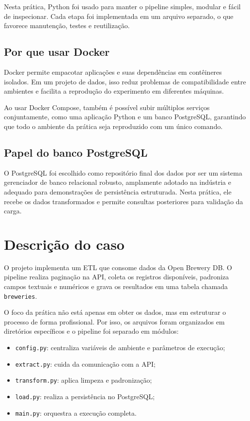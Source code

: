 \documentclass[12pt,a4paper]{article}
\begin{document}
Nesta prática, Python foi usado para manter o pipeline simples, modular e fácil de inspecionar. Cada etapa foi implementada em um arquivo separado, o que favorece manutenção, testes e reutilização.

\subsection{Por que usar Docker}
Docker permite empacotar aplicações e suas dependências em contêineres isolados. Em um projeto de dados, isso reduz problemas de compatibilidade entre ambientes e facilita a reprodução do experimento em diferentes máquinas.

Ao usar Docker Compose, também é possível subir múltiplos serviços conjuntamente, como uma aplicação Python e um banco PostgreSQL, garantindo que todo o ambiente da prática seja reproduzido com um único comando.

\subsection{Papel do banco PostgreSQL}
O PostgreSQL foi escolhido como repositório final dos dados por ser um sistema gerenciador de banco relacional robusto, amplamente adotado na indústria e adequado para demonstrações de persistência estruturada. Nesta prática, ele recebe os dados transformados e permite consultas posteriores para validação da carga.

\section{Descrição do caso}
O projeto implementa um ETL que consome dados da Open Brewery DB. O pipeline realiza paginação na API, coleta os registros disponíveis, padroniza campos textuais e numéricos e grava os resultados em uma tabela chamada \texttt{breweries}.

O foco da prática não está apenas em obter os dados, mas em estruturar o processo de forma profissional. Por isso, os arquivos foram organizados em diretórios específicos e o pipeline foi separado em módulos:

\begin{itemize}
    \item \texttt{config.py}: centraliza variáveis de ambiente e parâmetros de execução;
    \item \texttt{extract.py}: cuida da comunicação com a API;
    \item \texttt{transform.py}: aplica limpeza e padronização;
    \item \texttt{load.py}: realiza a persistência no PostgreSQL;
    \item \texttt{main.py}: orquestra a execução completa.
\end{itemize}
\end{document}
